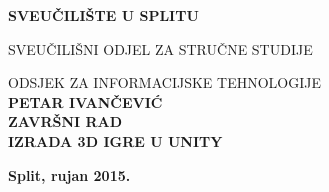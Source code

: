 \begin{center}
\thispagestyle{empty}

\begingroup
    \fontsize{14pt}{12pt}\selectfont\bfseries\center
 	SVEUČILIŠTE U SPLITU \par
	SVEUČILIŠNI ODJEL ZA STRUČNE STUDIJE \par
	ODSJEK ZA INFORMACIJSKE TEHNOLOGIJE
\endgroup\\[4cm]

{ \fontsize{18pt}{12pt}\selectfont\bfseries PETAR IVANČEVIĆ}\\[1cm]



{ \fontsize{14pt}{12pt}\selectfont\bfseries ZAVRŠNI RAD}\\[1cm]

{ \fontsize{21pt}{12pt}\selectfont\bfseries IZRADA 3D IGRE U UNITY}

\vfill
{ \fontsize{14pt}{12pt}\selectfont\bfseries Split, rujan 2015.}

\end{center}